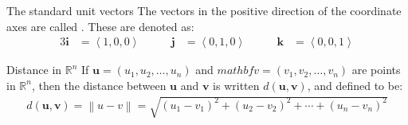 \documentclass[\main/notes.tex]{subfiles}
\begin{document}
			\begin{sidenote}{The standard unit vectors}
				The vectors in the positive direction of the coordinate axes are called . These are denoted as:
				\begin{alignat*}{3}
					\mathbf{i} &= \left\langle 1, 0, 0\right\rangle & \qquad
					\mathbf{j} &= \left\langle 0, 1, 0\right\rangle & \qquad
					\mathbf{k} &= \left\langle 0, 0, 1\right\rangle
				\end{alignat*}
			\end{sidenote}
			\begin{definition}{Distance in $\mathbb{R}^{n}$}
				If $\mathbf{u} = (u_{1}, u_{2}, \ldots, u_{n}) $ and $mathbf{v} = (v_{1}, v_{2}, \ldots, v_{n})$ are points in $\mathbb{R}^{n}$, then the distance between $\mathbf{u}$ and $\mathbf{v}$ is written $d(\mathbf{u}, \mathbf{v})$, and defined to be:
				\begin{align*}
					d(\mathbf{u}, \mathbf{v}) = \left\lVert u - v\right\rVert
					= \sqrt{(u_{1} - v_{1})^{2} + (u_{2} - v_{2})^{2} + \cdots + (u_{n} - v_{n})^{2}}
				\end{align*}
			\end{definition}
\end{document}

